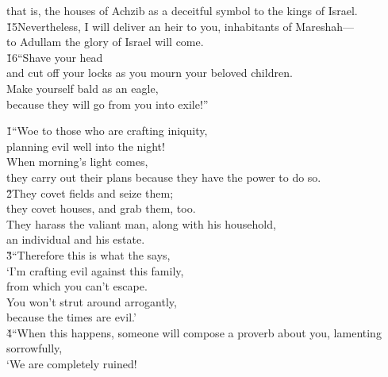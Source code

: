 \begin{poetry}
\poemll    that is, the houses of Achzib as a deceitful symbol to the kings of Israel. \\
\poeml \v{15}Nevertheless, I will deliver an heir to you, inhabitants of Mareshah--- \\
\poemll    to Adullam the glory of Israel will come. \\
\poeml \v{16}``Shave your head \\
\poemll    and cut off your locks as you mourn your beloved children. \\
\poeml Make yourself bald as an eagle, \\
\poemll    because they will go from you into exile!''
\end{poetry}

\begin{poetry}
\poeml {}
\v{1}``Woe to those who are crafting iniquity, \\
\poeml planning evil well into the night! \\
\poeml When morning's light comes, \\
\poemll    they carry out their plans because they have the power to do so. \\
\poeml \v{2}They covet fields and seize them; \\
\poemll    they covet houses, and grab them, too. \\
\poeml They harass the valiant man, along with his household, \\
\poemll    an individual and his estate. \\
\poeml \v{3}``Therefore this is what the  says, \\
\poeml `I'm crafting evil against this family, \\
\poemll    from which you can't escape. \\
\poeml You won't strut around arrogantly, \\
\poemll    because the times are evil.' \\
\poeml \v{4}``When this happens, someone will compose a proverb about you, lamenting sorrowfully, \\
\poemll    `We are completely ruined! \\

\end{poetry}
